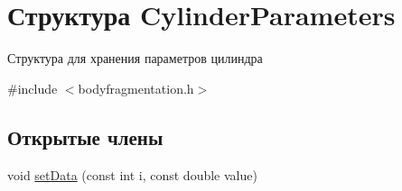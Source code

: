 \hypertarget{struct_cylinder_parameters}{}\section{Структура Cylinder\+Parameters}
\label{struct_cylinder_parameters}


Структура для хранения параметров цилиндра  




{\ttfamily \#include $<$bodyfragmentation.\+h$>$}

\subsection*{Открытые члены}
\begin{DoxyCompactItemize}
\item 
void \mbox{\hyperlink{struct_cylinder_parameters_a5c75f665f942d7e5f179d56dfd77f192}{set\+Data}} (const int i, const double value)
\end{DoxyCompactItemize}
